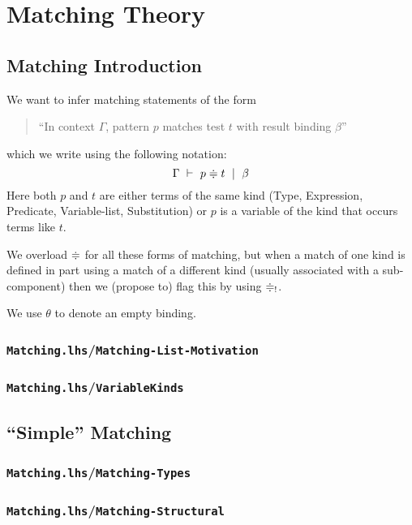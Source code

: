\section{Matching Theory}

\subsection{Matching Introduction}

We want to infer matching statements of the form
\begin{quote}
``In context $\Gamma$, pattern $p$ matches test $t$
with result binding $\beta$''
\end{quote}
which we write using the following notation:
\[
\Gamma \mathrel{~\vdash~} p \mathrel{\doteqdot} t \mathrel{~|~} \beta
\]
Here both $p$ and $t$ are either terms of the same kind
(Type, Expression, Predicate,
Variable-list, Substitution)
or $p$ is a variable of the kind that occurs terms like $t$.

We overload $\mathrel{\doteqdot}$ for all these forms of matching,
but when a match of one kind is defined in part using
a match of a different kind
(usually associated with a sub-component)
then we (propose to) flag this by using $\mathrel{\doteqdot}_!$.

We use $\theta$ to denote an empty binding.


\subsubsection{\texttt{Matching.lhs}/\texttt{Matching-List-Motivation}}


\subsubsection{\texttt{Matching.lhs}/\texttt{VariableKinds}}


\subsection{``Simple'' Matching}

\subsubsection{\texttt{Matching.lhs}/\texttt{Matching-Types}}


\subsubsection{\texttt{Matching.lhs}/\texttt{Matching-Structural}}


